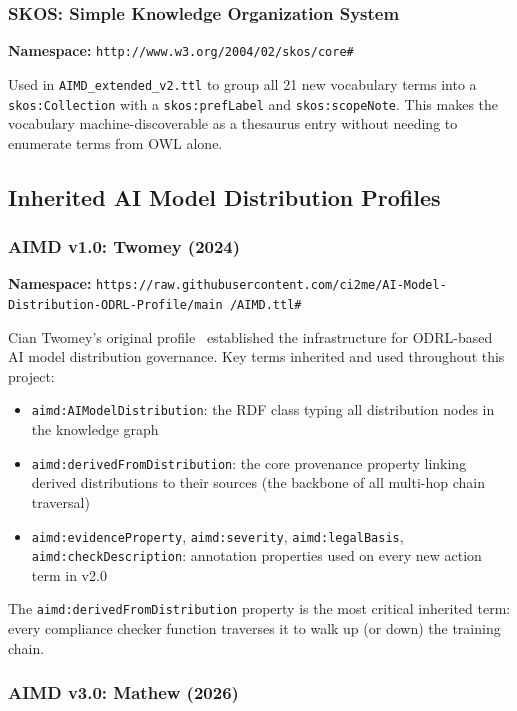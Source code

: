 \documentclass[12pt,a4paper]{article}
\begin{document}
\subsubsection{SKOS: Simple Knowledge Organization System}

\textbf{Namespace:} \texttt{http://www.w3.org/2004/02/skos/core\#}

Used in \texttt{AIMD\_extended\_v2.ttl} to group all 21 new vocabulary terms into a \texttt{skos:Collection} with a \texttt{skos:prefLabel} and \texttt{skos:scopeNote}. This makes the vocabulary machine-discoverable as a thesaurus entry without needing to enumerate terms from OWL alone.

\subsection{Inherited AI Model Distribution Profiles}

\subsubsection{AIMD v1.0: Twomey (2024)}

\textbf{Namespace:} \texttt{https://raw.githubusercontent.com/ci2me/AI-Model-\linebreak Distribution-ODRL-Profile/main /AIMD.ttl\#}

Cian Twomey's original profile~\cite{twomey2024} established the infrastructure for ODRL-based AI model distribution governance. Key terms inherited and used throughout this project:

\begin{itemize}[noitemsep]
  \item \texttt{aimd:AIModelDistribution}: the RDF class typing all distribution nodes in the knowledge graph
  \item \texttt{aimd:derivedFromDistribution}: the core provenance property linking derived distributions to their sources (the backbone of all multi-hop chain traversal)
  \item \texttt{aimd:evidenceProperty}, \texttt{aimd:severity}, \texttt{aimd:legalBasis}, \texttt{aimd:checkDescription}: annotation properties used on every new action term in v2.0
\end{itemize}

The \texttt{aimd:derivedFromDistribution} property is the most critical inherited term: every compliance checker function traverses it to walk up (or down) the training chain.

\subsubsection{AIMD v3.0: Mathew (2026)}
\end{document}
